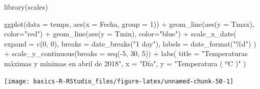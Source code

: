\documentclass[
  title=normal,
  notoc,
  bib=normal]{mnye}
\newenvironment{Shaded}{\begin{snugshade}}{\end{snugshade}}
\newcommand{\AttributeTok}[1]{\textcolor[rgb]{0.77,0.63,0.00}{#1}}
\newcommand{\DecValTok}[1]{\textcolor[rgb]{0.00,0.00,0.81}{#1}}
\newcommand{\FunctionTok}[1]{\textcolor[rgb]{0.00,0.00,0.00}{#1}}
\newcommand{\NormalTok}[1]{#1}
\newcommand{\SpecialCharTok}[1]{\textcolor[rgb]{0.00,0.00,0.00}{#1}}
\newcommand{\StringTok}[1]{\textcolor[rgb]{0.31,0.60,0.02}{#1}}
\begin{document}
\begin{Shaded}
\begin{Highlighting}[]
\FunctionTok{library}\NormalTok{(scales)}

\FunctionTok{ggplot}\NormalTok{(}\AttributeTok{data =}\NormalTok{ temps, }\FunctionTok{aes}\NormalTok{(}\AttributeTok{x =}\NormalTok{ Fecha, }\AttributeTok{group =} \DecValTok{1}\NormalTok{)) }\SpecialCharTok{+} 
    \FunctionTok{geom\_line}\NormalTok{(}\FunctionTok{aes}\NormalTok{(}\AttributeTok{y =}\NormalTok{ Tmax), }\AttributeTok{color=}\StringTok{"red"}\NormalTok{) }\SpecialCharTok{+} 
    \FunctionTok{geom\_line}\NormalTok{(}\FunctionTok{aes}\NormalTok{(}\AttributeTok{y =}\NormalTok{ Tmin), }\AttributeTok{color=}\StringTok{"blue"}\NormalTok{) }\SpecialCharTok{+} 
    \FunctionTok{scale\_x\_date}\NormalTok{(}
        \AttributeTok{expand =} \FunctionTok{c}\NormalTok{(}\DecValTok{0}\NormalTok{, }\DecValTok{0}\NormalTok{),}
        \AttributeTok{breaks =} \FunctionTok{date\_breaks}\NormalTok{(}\StringTok{"1 day"}\NormalTok{), }
        \AttributeTok{labels =} \FunctionTok{date\_format}\NormalTok{(}\StringTok{"\%d"}\NormalTok{)}
\NormalTok{    ) }\SpecialCharTok{+}
    \FunctionTok{scale\_y\_continuous}\NormalTok{(}\AttributeTok{breaks =} \FunctionTok{seq}\NormalTok{(}\SpecialCharTok{{-}}\DecValTok{5}\NormalTok{, }\DecValTok{30}\NormalTok{, }\DecValTok{5}\NormalTok{)) }\SpecialCharTok{+} 
    \FunctionTok{labs}\NormalTok{(}
        \AttributeTok{title =} \StringTok{"Temperaturas máximas y mínimas en abril de 2018"}\NormalTok{,}
        \AttributeTok{x =} \StringTok{"Día"}\NormalTok{,}
        \AttributeTok{y =} \StringTok{"Temperatura ( ºC )"}
\NormalTok{    )}
\end{Highlighting}
\end{Shaded}

\begin{center}\texttt{[image: basics-R-RStudio\_files/figure-latex/unnamed-chunk-50-1]} \end{center}

\printbibliography

%
\end{document}
